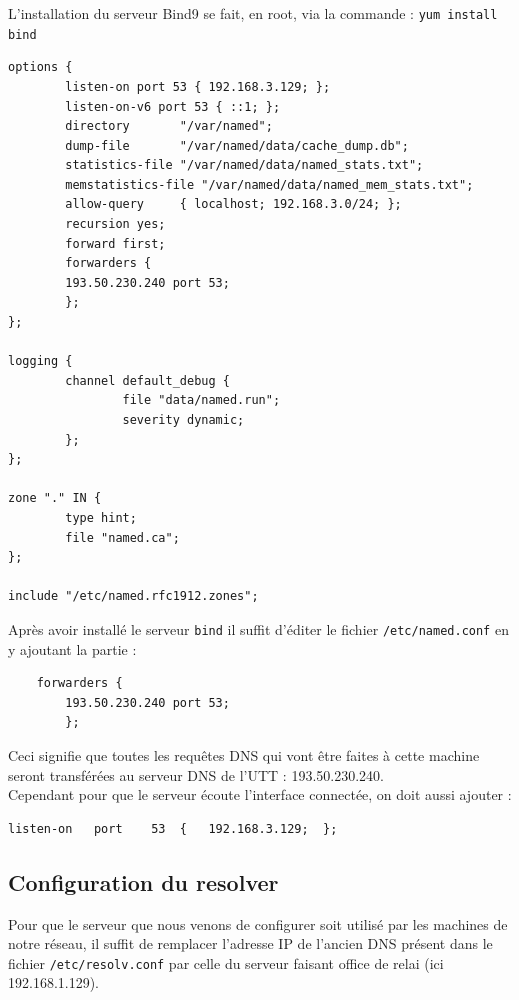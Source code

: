 \documentclass[12pt,a4paper,notitlepage]{article}
\begin{document}
L'installation du serveur Bind9 se fait, en root, via la commande : \texttt{yum install bind}
\begin{lstlisting}[title=Contenu du fichier named.conf]
options {
        listen-on port 53 { 192.168.3.129; };
        listen-on-v6 port 53 { ::1; };
        directory       "/var/named";
        dump-file       "/var/named/data/cache_dump.db";
        statistics-file "/var/named/data/named_stats.txt";
        memstatistics-file "/var/named/data/named_mem_stats.txt";
        allow-query     { localhost; 192.168.3.0/24; };
        recursion yes;
        forward first;
        forwarders {
        193.50.230.240 port 53;
        };
};

logging {
        channel default_debug {
                file "data/named.run";
                severity dynamic;
        };
};

zone "." IN {
        type hint;
        file "named.ca";
};

include "/etc/named.rfc1912.zones";
\end{lstlisting}

Après avoir installé le serveur \texttt{bind} il suffit d'éditer le fichier \texttt{/etc/named.conf} en y ajoutant la partie : 
\begin{center}
	\begin{verbatim}
	forwarders {
		193.50.230.240 port 53;
		};
	\end{verbatim}
\end{center}

Ceci signifie que toutes les requêtes DNS qui vont être faites à cette machine seront transférées au serveur DNS de l'UTT :  193.50.230.240.\\

Cependant pour que le serveur écoute l'interface connectée, on doit aussi ajouter :
\begin{verbatim}
listen-on	port	53	{	192.168.3.129;	};
\end{verbatim}



\subsection{Configuration du resolver}
Pour que le serveur que nous venons de configurer soit utilisé par les machines de notre réseau, il suffit de remplacer l'adresse IP de l'ancien DNS présent dans le fichier \texttt{/etc/resolv.conf} par celle du serveur faisant office de relai (ici 192.168.1.129). 
\end{document}
